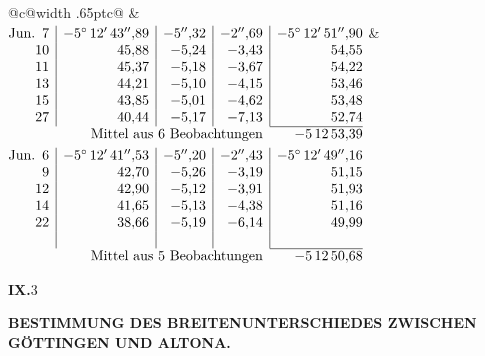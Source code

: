 \noindent\begin{tabular}{@{}c@{\hspace{.4em}\vrule width .65pt\hspace{.4em}}c@{}}
 &
 \\[.18ex]
\(\begin{array}[t]{@{}r|r|r|r|r@{}}
\text{Jun.}\enspace 7 & -5^\circ\,12'\,43''{,}89 & -5''{,}32 & -2''{,}69 & -5^\circ\,12'\,51''{,}90\\
10 & 45{,}88 & -5{,}24 & -3{,}43 & 54{,}55\\
11 & 45{,}37 & -5{,}18 & -3{,}67 & 54{,}22\\
13 & 44{,}21 & -5{,}10 & -4{,}15 & 53{,}46\\
15 & 43{,}85 & -5{,}01 & -4{,}62 & 53{,}48\\
27 & 40{,}44 & -5{,}17 & -7{,}13 & 52{,}74\\
\cline{5-5}
\multicolumn{4}{r}{\text{Mittel aus 6 Beobachtungen}} & -5\,12\,53{,}39
\end{array}\)
&
\(\begin{array}[t]{@{}r|r|r|r|r@{}}
\text{Jun.}\enspace 6 & -5^\circ\,12'\,41''{,}53 & -5''{,}20 & -2''{,}43 & -5^\circ\,12'\,49''{,}16\\
9 & 42{,}70 & -5{,}26 & -3{,}19 & 51{,}15\\
12 & 42{,}90 & -5{,}12 & -3{,}91 & 51{,}93\\
14 & 41{,}65 & -5{,}13 & -4{,}38 & 51{,}16\\
22 & 38{,}66 & -5{,}19 & -6{,}14 & 49{,}99\\
 & & & & \\
\cline{5-5}
\multicolumn{4}{r}{\text{Mittel aus 5 Beobachtungen}} & -5\,12\,50{,}68
\end{array}\)
\end{tabular}\par\medskip
\noindent\textbf{IX.}\hfill 3\hspace{.12\textwidth}\par

\par\clearpage
\noindent{}\parbox[t]{\dimexpr\linewidth-24mm\relax}{\centering\scriptsize\bfseries BESTIMMUNG DES BREITENUNTERSCHIEDES ZWISCHEN GÖTTINGEN UND ALTONA.}\makebox[12mm][r]{}\par\medskip

